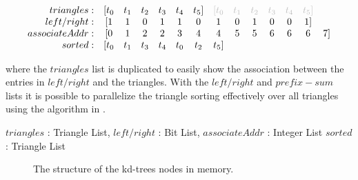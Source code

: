 \begin{displaymath}
  \begin{array}{r c c c c c c c c c c c c c}
    triangles: & [t_0 & t_1 & t_2 & t_3 & t_4 & t_5] & \color{lightgray}[t_0 & \color{lightgray}t_1 & \color{lightgray}t_2 & \color{lightgray}t_3 & \color{lightgray}t_4 & \color{lightgray}t_5]\\
    left/right: & [1 & 1 & 0 & 1 & 1 & 0 & 1 & 0 & 1 & 0 & 0 & 1]\\
    associateAddr: & [0 & 1 & 2 & 2 & 3 & 4 & 4 & 5 & 5 & 6 & 6 & 6 & 7]\\
    sorted: & [t_0 & t_1 & t_3 & t_4 & t_0 & t_2 & t_5]
  \end{array}
\end{displaymath}

where the $triangles$ list is duplicated to easily show the association between
the entries in $left/right$ and the triangles. With the $left/right$ and
$prefix-sum$ lists it is possible to parallelize the triangle sorting
effectively over all triangles using the algorithm in .

\begin{algorithm}
  \caption{Parallel triangle sorting.}
  \label{alg:triangleSort}
  \begin{algorithmic}
              {$triangles$ : Triangle List, $left/right$ : Bit List, $associateAddr$ : Integer List}
              {$sorted$ : Triangle List}
              {
                \ENDIF
                \ENDIF
               \ENDFOR}
  \end{algorithmic}
\end{algorithm}


\begin{figure}
  \centering
  \caption{The structure of the kd-trees nodes in memory.}
  \label{fig:nodeStructure}
\end{figure}

